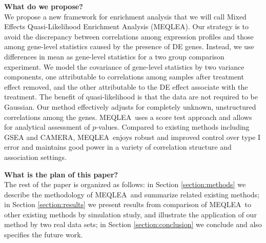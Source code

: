 \documentclass[useAMS,usenatbib, galley]{biom}
\newcommand{\OurMethod}{MEQLEA}
\begin{document}
	
	
	\textbf{What do we propose?} \\
	We propose a new framework for enrichment analysis that we will call Mixed Effects Quasi-Likelihood Enrichment Analysis (\OurMethod). Our strategy is to avoid the discrepancy between correlations among expression profiles and those among gene-level statistics caused by the presence of DE genes. Instead, we use differences in mean as gene-level statistics for a two group comparison experiment. We model the covariance of gene-level statistics by two variance components, one attributable to correlations among samples after treatment effect removed, and the other attributable to the DE effect associate with the treatment. The benefit of quasi-likelihood is that the data are not required to be Gaussian. Our method effectively adjusts for completely unknown, unstructured correlations among the genes. \OurMethod~uses a score test approach and allows for analytical assessment of $p$-values. Compared to existing methods including GSEA and CAMERA, \OurMethod~enjoys robust and improved control over type I error and maintains good power in a variety of correlation structure and association settings. 
	
	\textbf{What is the plan of this paper?} \\
	The rest of the paper is organized as follows: in Section \ref{section:methods} we describe the methodology of \OurMethod~and summarize related existing methods; in Section \ref{section:results} we present results from comparison of \OurMethod~to other existing methods by simulation study, and illustrate the application of our method by two real data sets; in Section \ref{section:conclusion} we conclude and also specifies the future work.

	
	
\end{document}

